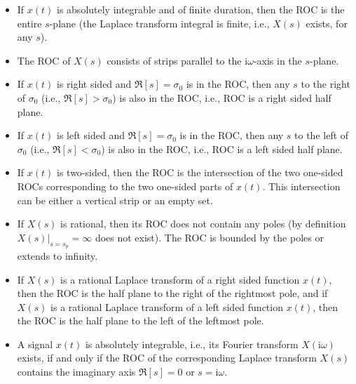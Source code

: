 	\begin{itemize}
	
	\item If $x(t)$ is absolutely integrable and of finite duration, then the ROC is the entire $s$-plane (the Laplace transform integral is finite, i.e., $X(s)$ exists, for any $s$).
	
	\item The ROC of $X(s)$ consists of strips parallel to the $\mathrm{i}\omega$-axis in the $s$-plane.
	
	\item If $x(t)$ is right sided and $\Re[s]=\sigma_0$ is in the ROC, then any $s$ to	the right of $\sigma_0$ (i.e., $\Re[s]>\sigma_0$) is also in the ROC, i.e., ROC is a right sided half plane.
	
	\item If $x(t)$ is left sided and $\Re[s]=\sigma_0$ is in the ROC, then any $s$ to the left of $\sigma_0$ (i.e., $\Re[s]<\sigma_0$) is also in the ROC, i.e., ROC is a left sided half plane.
	
	\item If $x(t)$ is two-sided, then the ROC is the intersection of the two one-sided ROCs corresponding to the two one-sided parts of $x(t)$. This intersection can be either a vertical strip or an empty set.
	
	\item If $X(s)$ is rational, then its ROC does not contain any poles (by definition $X(s)|_{s=s_p}=\infty$ does not exist). The ROC is bounded by the poles or extends to infinity.
	
	\item If $X(s)$ is a rational Laplace transform of a right sided function $x(t)$, then the ROC is the half plane to the right of the rightmost pole, and if $X(s)$ is a rational Laplace transform of a left sided function $x(t)$, then the ROC is the half plane to the left of the leftmost pole.
	
	\item A signal $x(t)$ is absolutely integrable, i.e., its Fourier transform $X(\mathrm{i}\omega)$ exists, if and only if the ROC of the corresponding Laplace transform $X(s)$ contains the imaginary axis $\Re[s]=0$ or $s=\mathrm{i}\omega$.
	
	\end{itemize}
	
